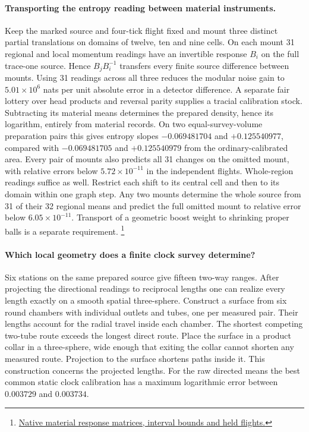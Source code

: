 \documentclass[11pt]{article}
\begin{document}
\paragraph{Transporting the entropy reading between material instruments.}
Keep the marked source and four-tick flight fixed and mount three distinct
partial translations on domains of twelve, ten and nine cells. On each
mount 31 regional and local momentum readings have an invertible response
$B_i$ on the full trace-one source. Hence $B_jB_i^{-1}$ transfers every
finite source difference between mounts. Using 31 readings across all
three reduces the modular noise gain to $5.01\times10^6$ nats per unit
absolute error in a detector difference. A separate fair lottery over
head products and reversal parity supplies a tracial calibration stock.
Subtracting its material means determines the prepared density, hence
its logarithm, entirely from material records. On two equal-survey-volume
preparation pairs this gives entropy slopes $-0.069481704$ and
$+0.125540977$, compared with $-0.069481705$ and $+0.125540979$ from
the ordinary-calibrated area. Every pair of mounts also predicts all 31
changes on the omitted mount, with relative errors below
$5.72\times10^{-11}$ in the independent flights. Whole-region readings
suffice as well. Restrict each shift to its central cell and then to
its domain within one graph step. Any two mounts determine the whole
source from 31 of their 32 regional means and predict the full omitted
mount to relative error below $6.05\times10^{-11}$. Transport of
a geometric boost weight to shrinking proper balls is a separate requirement.%
\footnote{\href{https://github.com/FloatingPragma/observer-patch-holography/tree/main/code/matched_einstein_limit/source_implication/full_algebra/correlation_rank/spatial_cuts/chart_transport}{Native material response matrices, interval bounds and held flights.}}

\paragraph{Which local geometry does a finite clock survey determine?}
Six stations on the same prepared source give fifteen two-way ranges.
After projecting the directional readings to reciprocal lengths one can
realize every length exactly on a smooth spatial three-sphere. Construct
a surface from six round chambers with individual outlets and tubes, one
per measured pair. Their lengths account for the radial travel inside
each chamber. The shortest competing two-tube route exceeds the
longest direct route. Place the surface in a product collar in a
three-sphere, wide enough that exiting the collar cannot shorten any
measured route. Projection to the surface shortens paths inside it.
This construction concerns the projected lengths. For the raw directed
means the best common static clock calibration has a maximum
logarithmic error between $0.003729$ and $0.003734$.
\end{document}
